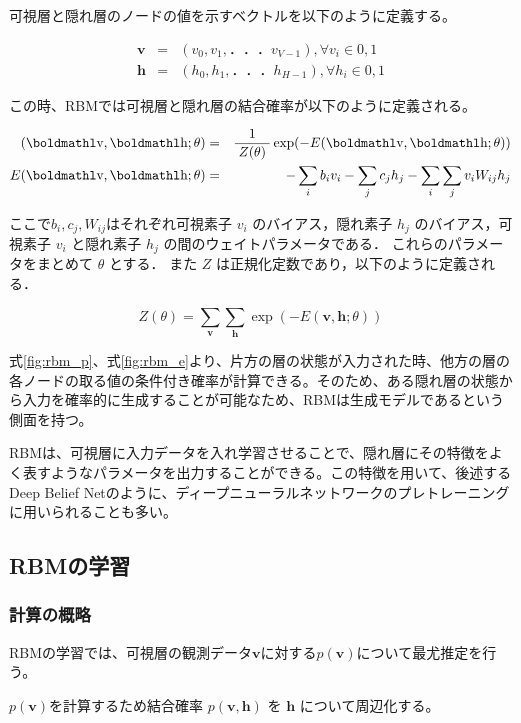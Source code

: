 可視層と隠れ層のノードの値を示すベクトルを以下のように定義する。

\begin{eqnarray}
	\bm{v} & = & (v_0,v_1,．．．v_{V-1} ), \forall v_i \in {0,1} \\
	\bm{h} & = & (h_0,h_1,．．．h_{H-1} ), \forall h_i \in {0,1}
\end{eqnarray}

この時、RBMでは可視層と隠れ層の結合確率が以下のように定義される。

\begin{eqnarray}\label
	p(\bm{v}, \bm{h}; \theta) & = & \frac{1}{Z(\theta)}  \exp (-E(\bm{v},\bm{h};\theta)) \label{fig:rbm_p}\\
	E(\bm{v}, \bm{h}; \theta) & = & -\sum_i b_i v_i - \sum_j c_j h_j- \sum_i \sum_j v_i W_{ij} h_j \label{fig:rbm_e}
\end{eqnarray}

ここで$b_i,c_j,W_{ij}$はそれぞれ可視素子 $v_i$ のバイアス，隠れ素子 $ h_j $ のバイアス，可視素子 $ v_i $ と隠れ素子 $ h_j $ の間のウェイトパラメータである．
これらのパラメータをまとめて $ \theta $ とする．
また $ Z $ は正規化定数であり，以下のように定義される．

\begin{equation}
	Z(\theta)= \sum_{\bm{v}} \sum_{\bm{h}} \exp (-E(\bm{v}, \bm{h}; \theta))
\end{equation}

式\ref{fig:rbm_p}、式\ref{fig:rbm_e}より、片方の層の状態が入力された時、他方の層の各ノードの取る値の条件付き確率が計算できる。そのため、ある隠れ層の状態から入力を確率的に生成することが可能なため、RBMは生成モデルであるという側面を持つ。

RBMは、可視層に入力データを入れ学習させることで、隠れ層にその特徴をよく表すようなパラメータを出力することができる。この特徴を用いて、後述するDeep Belief Netのように、ディープニューラルネットワークのプレトレーニングに用いられることも多い。

\subsection{RBMの学習}\label{sec:learn}
\subsubsection{計算の概略}
RBMの学習では、可視層の観測データ$\bm{v}$に対する$p(\bm{v})$について最尤推定を行う。

$p(\bm{v})$を計算するため結合確率 $p(\bm{v},\bm{h})$ を $\bm{h}$ について周辺化する。


